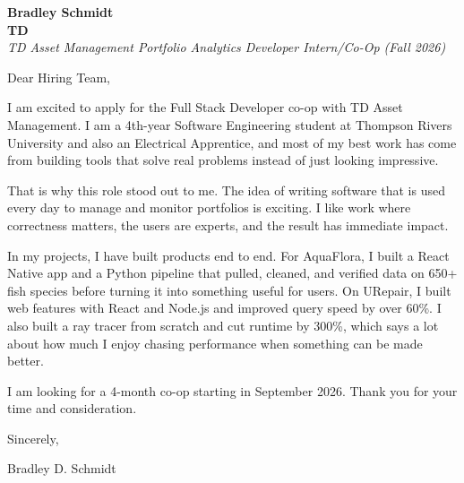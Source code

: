 \documentclass[11pt]{article}
\begin{document}
\textbf{Bradley Schmidt}\\
\vspace{0.5em}
\textbf{TD}\\
\textit{TD Asset Management Portfolio Analytics Developer Intern/Co-Op (Fall 2026)}

Dear Hiring Team,

\par

I am excited to apply for the Full Stack Developer co-op with TD Asset Management. I am a 4th-year Software Engineering student at Thompson Rivers University and also an Electrical Apprentice, and most of my best work has come from building tools that solve real problems instead of just looking impressive.

\par

That is why this role stood out to me. The idea of writing software that is used every day to manage and monitor portfolios is exciting. I like work where correctness matters, the users are experts, and the result has immediate impact.

\par

In my projects, I have built products end to end. For AquaFlora, I built a React Native app and a Python pipeline that pulled, cleaned, and verified data on 650+ fish species before turning it into something useful for users. On URepair, I built web features with React and Node.js and improved query speed by over 60\%. I also built a ray tracer from scratch and cut runtime by 300\%, which says a lot about how much I enjoy chasing performance when something can be made better.

\par

I am looking for a 4-month co-op starting in September 2026. Thank you for your time and consideration.

\par

Sincerely,

\par

Bradley D. Schmidt
\end{document}
